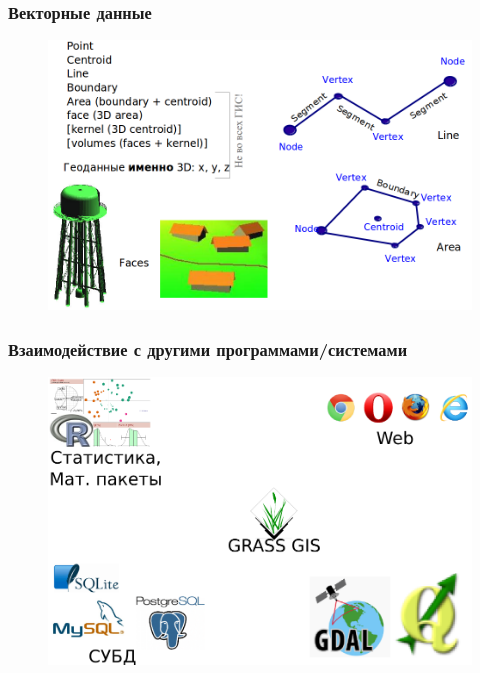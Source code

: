 \begin{frame}
\frametitle{Векторные данные}
\begin{figure}[!ht]
          \begin{center}
            \includegraphics[width=\columnwidth]{./grass/img/vector_data.png}
        \end{center}
\end{figure}
\end{frame}


\begin{frame}
\frametitle{Взаимодействие с другими программами/системами}
\begin{figure}[!ht]
          \begin{center}
            \includegraphics[width=0.9\columnwidth]{./grass/img/grass_prog.png}
        \end{center}
\end{figure}
\end{frame}

